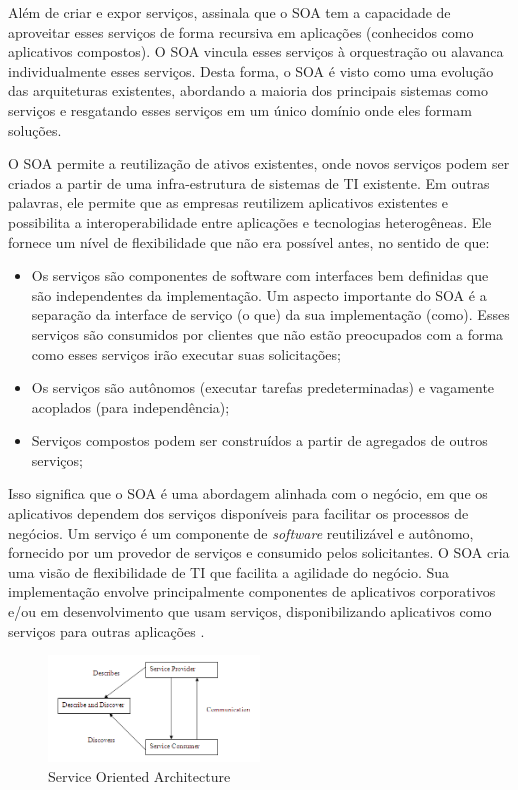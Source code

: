 Além de criar e expor serviços,  assinala que o SOA tem a capacidade de aproveitar esses serviços de forma recursiva em aplicações (conhecidos como aplicativos compostos). O SOA vincula esses serviços à orquestração ou alavanca individualmente esses serviços. Desta forma, o SOA é visto como uma evolução das arquiteturas existentes, abordando a maioria dos principais sistemas como serviços e resgatando esses serviços em um único domínio onde eles formam soluções.

 O SOA permite a reutilização de ativos existentes, onde novos serviços podem ser criados a partir de uma infra-estrutura de sistemas de TI existente. Em outras palavras, ele permite que as empresas reutilizem aplicativos existentes e possibilita a interoperabilidade entre aplicações e tecnologias heterogêneas. Ele fornece um nível de flexibilidade que não era possível antes, no sentido de que:

\begin{itemize}
    \item Os serviços são componentes de software com interfaces bem definidas que são independentes da implementação. Um aspecto importante do SOA é a separação da interface de serviço (o que) da sua implementação (como). Esses serviços são consumidos por clientes que não estão preocupados com a forma como esses serviços irão executar suas solicitações;
    \item Os serviços são autônomos (executar tarefas predeterminadas) e vagamente acoplados (para independência);
    \item Serviços compostos podem ser construídos a partir de agregados de outros serviços;
\end{itemize}

Isso significa que o SOA é uma abordagem alinhada com o negócio, em que os aplicativos dependem dos serviços disponíveis para facilitar os processos de negócios. Um serviço é um componente de \textit{software} reutilizável e autônomo, fornecido por um provedor de serviços e consumido pelos solicitantes. O SOA cria uma visão de flexibilidade de TI que facilita a agilidade do negócio. Sua implementação envolve principalmente componentes de aplicativos corporativos e/ou em desenvolvimento que usam serviços, disponibilizando aplicativos como serviços para outras aplicações \cite{soa-book}.

\begin{figure}[htbp]
    \centering
    \includegraphics[width=0.5\textwidth]{figuras/soa.png}
    \caption{Service Oriented Architecture}
    \label{fig:soa}
\end{figure}

